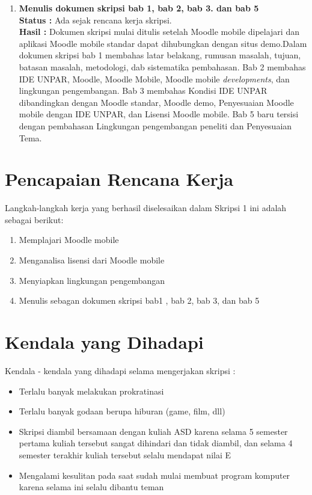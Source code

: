 \documentclass[a4paper,twoside]{article}
\begin{document}
\begin{enumerate}
\begin{enumerate}
\end{enumerate}

		
		\item \textbf{Menulis dokumen skripsi bab 1, bab 2, bab 3. dan bab 5}\\
		{\bf Status :} Ada sejak rencana kerja skripsi.\\
		{\bf Hasil :} Dokumen skripsi mulai ditulis setelah Moodle mobile dipelajari dan aplikasi Moodle mobile standar dapat dihubungkan dengan situs demo.Dalam dokumen skripsi bab 1 membahas latar belakang, rumusan masalah, tujuan, batasan masalah, metodologi, dab sistematika pembahasan. Bab 2 membahas IDE UNPAR, Moodle, Moodle Mobile,  Moodle mobile \textit{developments}, dan lingkungan pengembangan. Bab 3 membahas Kondisi IDE UNPAR dibandingkan dengan Moodle standar, Moodle demo, Penyesuaian Moodle mobile dengan IDE UNPAR, dan Lisensi Moodle mobile. Bab 5 baru tersisi dengan pembahasan Lingkungan pengembangan peneliti dan Penyesuaian Tema.
		

	\end{enumerate}

\section{Pencapaian Rencana Kerja}
Langkah-langkah kerja yang berhasil diselesaikan dalam Skripsi 1 ini adalah sebagai berikut:
\begin{enumerate}
\item Memplajari Moodle mobile
\item Menganalisa lisensi dari Moodle mobile
\item Menyiapkan lingkungan pengembangan
\item Menulis sebagan dokumen skripsi bab1 , bab 2,  bab 3, dan bab 5
\end{enumerate}



\section{Kendala yang Dihadapi}
Kendala - kendala yang dihadapi selama mengerjakan skripsi :
\begin{itemize}
	\item Terlalu banyak melakukan prokratinasi
	\item Terlalu banyak godaan berupa hiburan (game, film, dll)
	\item Skripsi diambil bersamaan dengan kuliah ASD karena selama 5 semester pertama kuliah tersebut sangat dihindari dan tidak diambil, dan selama 4 semester terakhir kuliah tersebut selalu mendapat nilai E
	\item Mengalami kesulitan pada saat sudah mulai membuat program komputer karena selama ini selalu dibantu teman
\end{itemize}
\end{document}
